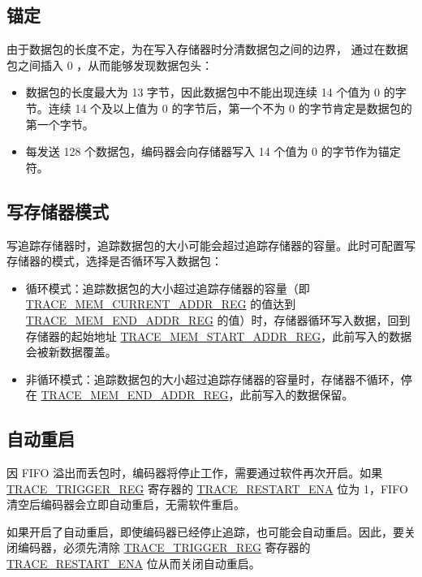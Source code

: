 \documentclass[main\_\_CN.tex]{subfiles}
\begin{document}
\subsection{锚定}

由于数据包的长度不定，为在写入存储器时分清数据包之间的边界，\chipname{} 通过在数据包之间插入 0 ，从而能够发现数据包头：
\begin{itemize}
    \item 数据包的长度最大为 13 字节，因此数据包中不能出现连续 14 个值为 0 的字节。连续 14 个及以上值为 0 的字节后，第一个不为 0 的字节肯定是数据包的第一个字节。
    \item 每发送 128 个数据包，编码器会向存储器写入 14 个值为 0 的字节作为锚定符。
\end{itemize}


\subsection{写存储器模式}

写追踪存储器时，追踪数据包的大小可能会超过追踪存储器的容量。此时可配置写存储器的模式，选择是否循环写入数据包：

\begin{itemize}
    \item 循环模式：追踪数据包的大小超过追踪存储器的容量（即 \hyperref[regdesc:TRACEMEMCURRENTADDRREG]{TRACE\_MEM\_CURRENT\_ADDR\_REG} 的值达到 \hyperref[regdesc:TRACEMEMENDADDRREG]{TRACE\_MEM\_END\_ADDR\_REG} 的值）时，存储器循环写入数据，回到存储器的起始地址 \hyperref[regdesc:TRACEMEMSTARTADDRREG]{TRACE\_MEM\_START\_ADDR\_REG}，此前写入的数据会被新数据覆盖。
    \item 非循环模式：追踪数据包的大小超过追踪存储器的容量时，存储器不循环，停在 \hyperref[regdesc:TRACEMEMENDADDRREG]{TRACE\_MEM\_END\_ADDR\_REG}，此前写入的数据保留。
\end{itemize}

\subsection{自动重启}

因 FIFO 溢出而丢包时，编码器将停止工作，需要通过软件再次开启。如果 \hyperref[regdesc:TRACETRIGGERREG]{TRACE\_TRIGGER\_REG} 寄存器的 \hyperref[fielddesc:TRACERESTARTENA]{TRACE\_RESTART\_ENA} 位为 1，FIFO 清空后编码器会立即自动重启，无需软件重启。

如果开启了自动重启，即使编码器已经停止追踪，也可能会自动重启。因此，要关闭编码器，必须先清除 \hyperref[regdesc:TRACETRIGGERREG]{TRACE\_TRIGGER\_REG} 寄存器的 \hyperref[fielddesc:TRACERESTARTENA]{TRACE\_RESTART\_ENA} 位从而关闭自动重启。
\end{document}
